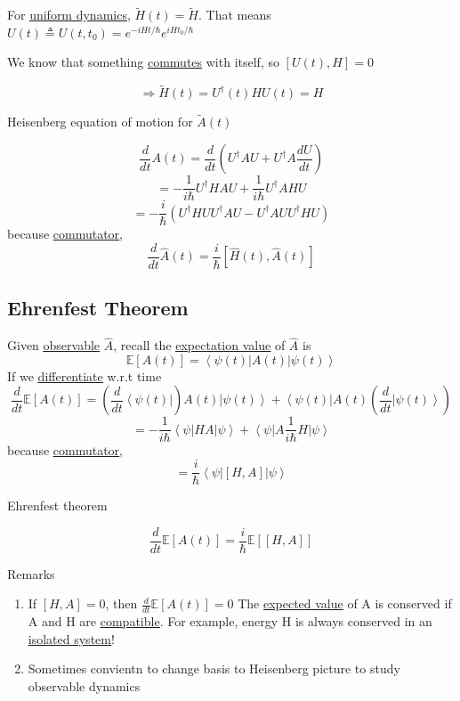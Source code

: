 \documentclass[
]{article}
\providecommand{\tightlist}{%
  \setlength{\itemsep}{0pt}\setlength{\parskip}{0pt}}
\let\oldhyperref\hyperref
\renewcommand{\hyperref}[2][]{\oldhyperref[#1]{\underline{#2}}}
\providecommand{\ket}[1]{\left\lvert #1 \right\rangle}
\providecommand{\bra}[1]{\left\langle #1 \right\rvert}
\providecommand{\Rarr}{\Rightarrow}
\begin{document}
For \hyperref[uniform-dynamics]{uniform dynamics}, $\tilde{H}(t)=\tilde{H}$. That means $U(t)\triangleq U(t,t_0)= e^{-iHt/\hbar}e^{iHt_0/\hbar}$

We know that something \hyperref[commutators]{commutes} with itself, so $[U(t), H]=0$


\[
	\Rarr \tilde{H}(t)=U^\dag(t)HU(t)=H
\]

Heisenberg equation of motion for $\tilde{A}(t)$

\[
	\frac{d}{dt}A(t)=\frac{d}{dt}(U^\dag AU + U^\dag A\frac{dU}{dt})
\]
\[
	=-\frac{1}{i\hbar}U^\dag H A U+\frac{1}{i\hbar}U^\dag A H U
\]
\[
	=-\frac{i}{\hbar}(U^\dag HU U^\dag A U - U^\dag A U U^\dag H U)
\]
because \hyperref[commutators]{commutator},
\[
	\boxed{\frac{d}{dt}\hat{A}(t)=\frac{i}{\hbar}[\hat{H}(t),\hat{A}(t)]}
\]

\subsection{Ehrenfest Theorem}\label{observables-in-time-evolution}
Given \hyperref[observables]{observable} $\hat{A}$, recall the \hyperref[expected-value-of-observables]{expectation value} of $\hat{A}$ is
\[
	\mathbb{E}[A(t)]=\bra{\psi(t)}A(t)\ket{\psi(t)}
\]
If we \hyperref[differentiation]{differentiate} w.r.t time
\[
	\frac{d}{dt}\mathbb{E}[A(t)]=\left(\frac{d}{dt}\bra{\psi(t)}\right)A(t)\ket{\psi(t)}+\bra{\psi(t)}A(t)\left(\frac{d}{dt}\ket{\psi(t)}\right)
\]
\[
	= -\frac{1}{i\hbar}\bra{\psi}HA\ket{\psi}+\bra{\psi}A\frac{1}{i\hbar}H\ket{\psi}
\]
because \hyperref[commutators]{commutator},
\[
	=\frac{i}{\hbar}\bra{\psi}[H,A]\ket{\psi}
\]


Ehrenfest theorem

\[
	\boxed{\frac{d}{dt}\mathbb{E}[A(t)]=\frac{i}{\hbar}\mathbb{E}\left[[H,A]\right]}
\]

Remarks

\begin{enumerate}
	\tightlist
	\item If $[H,A]=0$, then $\frac{d}{dt}\mathbb{E}[A(t)]=0$
	      The \hyperref[expected-value-of-observables]{expected value} of A is conserved if A and H are \hyperref[compatibility]{compatible}. For example, energy H is always conserved in an \hyperref[isolated-system]{isolated system}!
	\item Sometimes convientn to change basis to Heisenberg picture to study observable dynamics
\end{enumerate}
\end{document}
